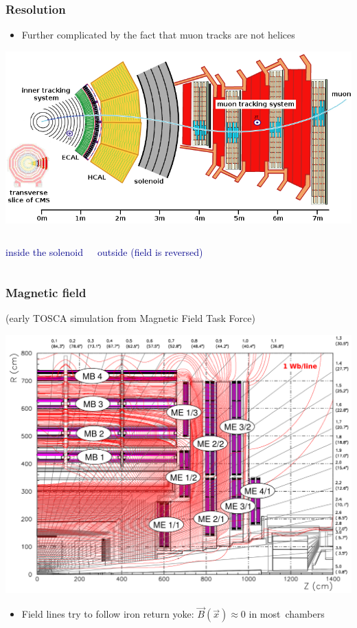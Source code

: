 \documentclass[compress]{beamer}
\begin{document}
\begin{frame}
\frametitle{Resolution}

\begin{itemize}
\item Further complicated by the fact that muon tracks are not helices
\end{itemize}

\includegraphics[width=\linewidth]{cms_slice.png}

\vfill
\begin{columns}
\begin{center}
\textcolor{darkblue}{inside the solenoid}
\end{center}
\begin{center}
\textcolor{darkblue}{outside (field is reversed)}
\end{center}
\end{columns}
\end{frame}

\begin{frame}
\frametitle{Magnetic field}

{\scriptsize (early TOSCA simulation from Magnetic Field Task Force)}

\includegraphics[width=0.9\linewidth]{muon_system_with_lines.png}

\begin{itemize}
\item Field lines try to follow iron return yoke: $\vec{B}(\vec{x}) \approx 0$ in \mbox{most chambers\hspace{-1 cm}}
\end{itemize}
\end{frame}
\end{document}
